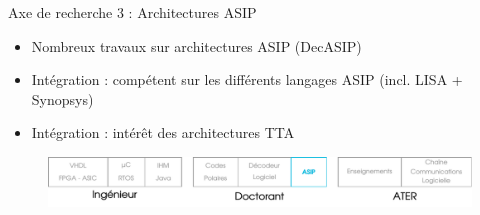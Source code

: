 \documentclass[t,compress,mathserif,12pt,xcolor=dvipsnames]{beamer}
\begin{document}
\begin{frame}[t]{Axe de recherche 3 : Architectures ASIP}
  \begin{minipage}[t][5.0cm][t]{\textwidth}
    \begin{itemize}
      \item<+-> Nombreux travaux sur architectures ASIP (DecASIP)
      \item<+-> Intégration : compétent sur les différents langages ASIP (incl. LISA + Synopsys)
      \item<+-> Intégration : intérêt des architectures TTA
    \end{itemize}
  \end{minipage}
  \begin{figure}[htp]
    \centering
    \includegraphics[width=\textwidth]{fig/frise22}
  \end{figure}
\end{frame}
\end{document}
